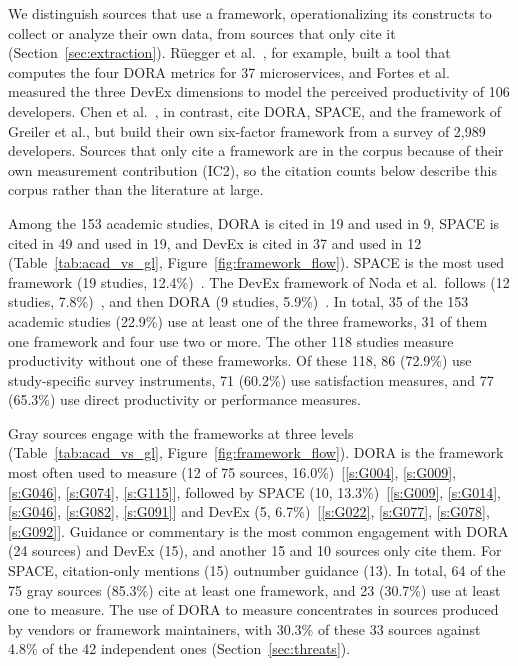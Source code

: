 \documentclass[preprint,number]{elsarticle}
\newcounter{study}
\newcommand{\refG}[1]{\ref{s:#1}}
\begin{document}
We distinguish sources that use a framework, operationalizing its constructs to collect or analyze their own data, from sources that only cite it (Section~\ref{sec:extraction}). R\"uegger et al.~\cite{P0470}, for example, built a tool that computes the four DORA metrics for 37 microservices, and Fortes et al.~\cite{P0244} measured the three DevEx dimensions to model the perceived productivity of 106 developers. Chen et al.~\cite{P2100}, in contrast, cite DORA, SPACE, and the framework of Greiler et al., but build their own six-factor framework from a survey of 2,989 developers. Sources that only cite a framework are in the corpus because of their own measurement contribution (IC2), so the citation counts below describe this corpus rather than the literature at large.

Among the 153 academic studies, DORA is cited in 19 and used in 9, SPACE is cited in 49 and used in 19, and DevEx is cited in 37 and used in 12 (Table~\ref{tab:acad_vs_gl}, Figure~\ref{fig:framework_flow}). SPACE is the most used framework (19 studies, 12.4\%)~\cite{P1259, P0001, P1816, P0112, P0061, P0549, P1261, P1476, P1303, P0181, P2019, P2020, P2038, P2041, P2059, P2073, P2131, P2133, P2134}. The DevEx framework of Noda et al.\ follows (12 studies, 7.8\%)~\cite{P1280, P1356, P0021, P0593, P0001, P0244, P1261, P2015, P2019, P2073, P2079, P2080}, and then DORA (9 studies, 5.9\%)~\cite{P0470, P0003, P1261, P2008, P2013, P2014, P2017, P2026, P2043}. In total, 35 of the 153 academic studies (22.9\%) use at least one of the three frameworks, 31 of them one framework and four use two or more. The other 118 studies measure productivity without one of these frameworks. Of these 118, 86 (72.9\%) use study-specific survey instruments, 71 (60.2\%) use satisfaction measures, and 77 (65.3\%) use direct productivity or performance measures.

Gray sources engage with the frameworks at three levels (Table~\ref{tab:acad_vs_gl}, Figure~\ref{fig:framework_flow}). DORA is the framework most often used to measure (12 of 75 sources, 16.0\%)~[\refG{G004}, \refG{G009}, \refG{G046}, \refG{G074}, \refG{G115}], followed by SPACE (10, 13.3\%)~[\refG{G009}, \refG{G014}, \refG{G046}, \refG{G082}, \refG{G091}] and DevEx (5, 6.7\%)~[\refG{G022}, \refG{G077}, \refG{G078}, \refG{G092}]. Guidance or commentary is the most common engagement with DORA (24 sources) and DevEx (15), and another 15 and 10 sources only cite them. For SPACE, citation-only mentions (15) outnumber guidance (13). In total, 64 of the 75 gray sources (85.3\%) cite at least one framework, and 23 (30.7\%) use at least one to measure. The use of DORA to measure concentrates in sources produced by vendors or framework maintainers, with 30.3\% of these 33 sources against 4.8\% of the 42 independent ones (Section~\ref{sec:threats}).
\end{document}
